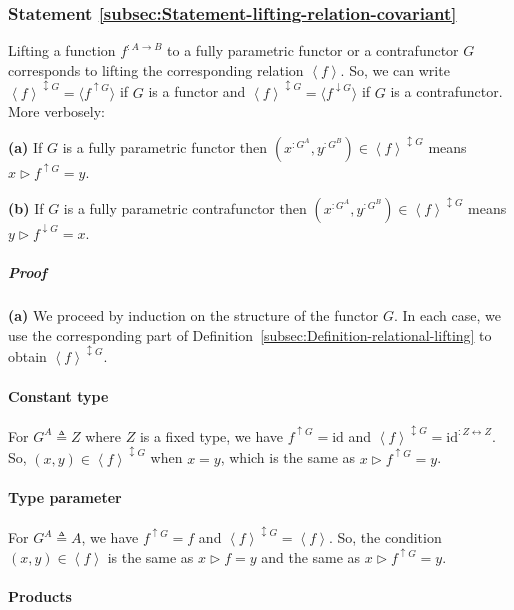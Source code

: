 \subsubsection{Statement \label{subsec:Statement-lifting-relation-covariant}\ref{subsec:Statement-lifting-relation-covariant}}

Lifting a function $f^{:A\rightarrow B}$ to a fully parametric functor
or a contrafunctor $G$ corresponds to lifting the corresponding relation
$\left<f\right>$. So, we can write $\left<f\right>^{\updownarrow G}=\langle f^{\uparrow G}\rangle$
if $G$ is a functor and $\left<f\right>^{\updownarrow G}=\langle f^{\downarrow G}\rangle$
if $G$ is a contrafunctor. More verbosely:

\textbf{(a)} If $G$ is a fully parametric functor then $(x^{:G^{A}},y^{:G^{B}})\in\left<f\right>^{\updownarrow G}$
means $x\triangleright f^{\uparrow G}=y$.

\textbf{(b)} If $G$ is a fully parametric contrafunctor then $(x^{:G^{A}},y^{:G^{B}})\in\left<f\right>^{\updownarrow G}$
means $y\triangleright f^{\downarrow G}=x$.

\subparagraph{Proof}

\textbf{(a)} We proceed by induction on the structure of the functor
$G$. In each case, we use the corresponding part of Definition~\ref{subsec:Definition-relational-lifting}
to obtain $\left<f\right>^{\updownarrow G}$.

\paragraph{Constant type}

For $G^{A}\triangleq Z$ where $Z$ is a fixed type, we have $f^{\uparrow G}=\text{id}$
and $\left<f\right>^{\updownarrow G}=\text{id}^{:Z\leftrightarrow Z}$.
So, $(x,y)\in\left<f\right>^{\updownarrow G}$ when $x=y$, which
is the same as $x\triangleright f^{\uparrow G}=y$.

\paragraph{Type parameter}

For $G^{A}\triangleq A$, we have $f^{\uparrow G}=f$ and $\left<f\right>^{\updownarrow G}=\left<f\right>$.
So, the condition $(x,y)\in\left<f\right>$ is the same as $x\triangleright f=y$
and the same as $x\triangleright f^{\uparrow G}=y$.

\paragraph{Products}

